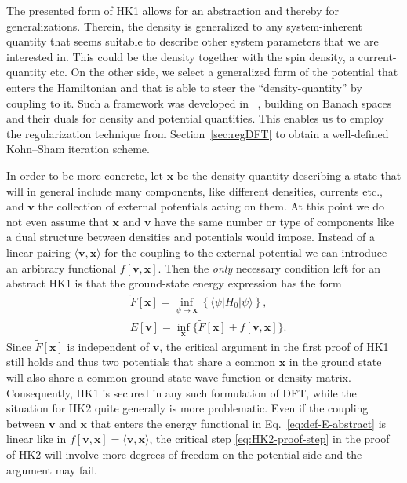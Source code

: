 \documentclass[journal=apcach,manuscript=article,layout=twocolumn]{achemso}
\newcommand{\xx}{\mathbf{x}}
\newcommand{\vv}{\mathbf{v}}
\newcommand{\changed}[1] {{ {#1}}} %
\begin{document}
The presented form of HK1 allows for an abstraction and thereby for generalizations. Therein, the density is generalized to any system-inherent quantity that seems suitable to describe other system parameters that we are interested in. This could be the density together with the spin density, a current-quantity etc.
On the other side, we select a generalized form of the potential that enters the Hamiltonian and that is able to steer the ``density-quantity'' by coupling to it. Such a framework was developed in \citeauthor{KSpaper2018}~\cite{KSpaper2018}, building on Banach spaces and their duals for density and potential quantities. This enables us to employ the regularization technique from Section~\ref{sec:regDFT} to obtain a well-defined Kohn--Sham iteration scheme.

In order to be more concrete, let $\xx$ be the density quantity describing a state that will in general include many components, like different densities, currents etc., and $\vv$ the collection of external potentials acting on them. At this point we do not even assume that $\xx$ and $\vv$ have the same number or type of components like a dual structure between densities and potentials would impose. Instead of a linear pairing $\langle\vv,\xx\rangle$ for the coupling to the external potential we can introduce an arbitrary functional $f[\vv,\xx ]$.
Then the \emph{only} necessary condition left for an abstract HK1 is that the ground-state energy expression has the form
\begin{align}
    &\tilde F[\xx] = \inf_{\psi \mapsto \xx}\left\{ \langle \psi |H_0 | \psi \rangle \right\}, \nonumber\\
    &E[\vv] = \inf_\xx \{\tilde F[\xx] + f[ \vv,\xx ]\}.\label{eq:def-E-abstract}
\end{align}
Since $\tilde F[\xx]$ is independent of $\vv$, the critical argument in the first proof of HK1 still holds and thus two potentials that share a common $\xx$ in the ground state will also share a common ground-state wave function or density matrix. Consequently, HK1 is secured in any such formulation of DFT, while the situation for HK2 quite generally is more problematic. Even if the coupling between $\vv$ and $\xx$ that enters the energy functional in \changed{Eq.~\eqref{eq:def-E-abstract}} is linear like in $f[\vv,\xx] = \langle \vv, \xx \rangle$, the critical step \eqref{eq:HK2-proof-step} in the proof of HK2 will involve more degrees-of-freedom on the potential side and the argument may fail.
\end{document}

